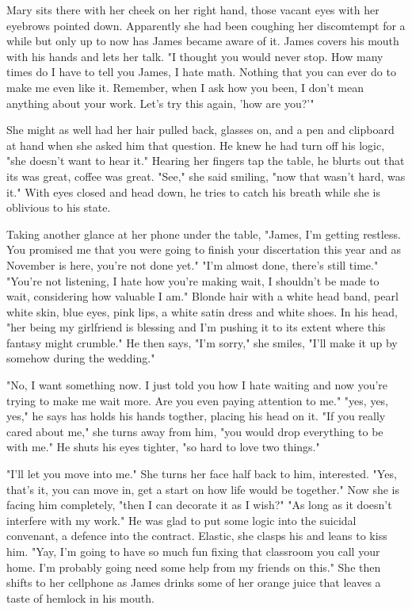         Mary sits there with her cheek on her right hand, those vacant eyes with her eyebrows pointed down. Apparently she had been coughing her
    discomtempt for a while but only up to now has James became aware of it. James covers his mouth with his hands and lets her talk. "I thought
    you would never stop. How many times do I have to tell you James, I hate math. Nothing that you can ever do to make me even like it. Remember,
    when I ask how you been, I don't mean anything about your work. Let's try this again, 'how are you?'"

       She might as well had her hair pulled back, glasses on, and a pen and clipboard at hand when she asked him that question. He knew he had
    turn off his logic, "she doesn't want to hear it." Hearing her fingers tap the table, he blurts out that its was great, coffee was great.
    "See," she said smiling, "now that wasn't hard, was it." With eyes closed and head down, he tries to catch his breath while she is oblivious
    to his state.

        Taking another glance at her phone under the table, "James, I'm getting restless. You promised me that you were going to finish your 
    discertation this year and as November is here, you're not done yet." "I'm almost done, there's still time." "You're not listening, I hate
    how you're making wait, I shouldn't be made to wait, considering how valuable I am." Blonde hair with a white head band, pearl white skin,
    blue eyes, pink lips, a white satin dress and white shoes. In his head, "her being my girlfriend is blessing and I'm pushing it to its extent
    where this fantasy might crumble." He then says, "I'm sorry," she smiles, "I'll make it up by somehow during the wedding."

        "No, I want something now. I just told you how I hate waiting and now you're trying to make me wait more. Are you even paying attention
    to me." "yes, yes, yes," he says has holds his hands togther, placing his head on it. "If you really cared about me," she turns away from
    him, "you would drop everything to be with me." He shuts his eyes tighter, "so hard to love two things."

        "I'll let you move into me." She turns her face half back to him, interested. "Yes, that's it, you can move in, get a start on how life
    would be together." Now she is facing him completely, "then I can decorate it as I wish?" "As long as it doesn't interfere with my work." He
    was glad to put some logic into the suicidal convenant, a defence into the contract. Elastic, she clasps his and leans to kiss him. "Yay,
    I'm going to have so much fun fixing that classroom you call your home. I'm probably going need some help from my friends on this." She
    then shifts to her cellphone as James drinks some of her orange juice that leaves a taste of hemlock in his mouth.

